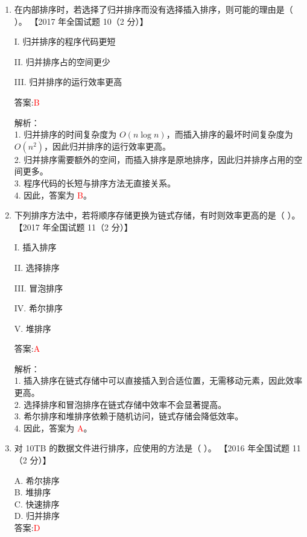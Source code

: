 \documentclass[lang=cn,newtx,10pt,scheme=chinese]{../../../elegantbook}
\begin{document}
\begin{enumerate}
    \item 在内部排序时，若选择了归并排序而没有选择插入排序，则可能的理由是（ ）。  
    【2017 年全国试题 10（2 分）】  

    I. 归并排序的程序代码更短  

    II. 归并排序占的空间更少  

    III. 归并排序的运行效率更高  

    答案:\textcolor{red}{B}

    解析：\\
    1. 归并排序的时间复杂度为 $O(n \log n)$，而插入排序的最坏时间复杂度为 $O(n^2)$，因此归并排序的运行效率更高。\\
    2. 归并排序需要额外的空间，而插入排序是原地排序，因此归并排序占用的空间更多。\\
    3. 程序代码的长短与排序方法无直接关系。\\
    4. 因此，答案为 \textcolor{red}{B}。\\

\item 下列排序方法中，若将顺序存储更换为链式存储，有时则效率更高的是（ ）。  
    【2017 年全国试题 11（2 分）】  

    I. 插入排序  

    II. 选择排序  

    III. 冒泡排序  

    IV. 希尔排序  

    V. 堆排序  

    答案:\textcolor{red}{A}

    解析：\\
    1. 插入排序在链式存储中可以直接插入到合适位置，无需移动元素，因此效率更高。\\
    2. 选择排序和冒泡排序在链式存储中效率不会显著提高。\\
    3. 希尔排序和堆排序依赖于随机访问，链式存储会降低效率。\\
    4. 因此，答案为 \textcolor{red}{A}。\\

\item 对 10TB 的数据文件进行排序，应使用的方法是（ ）。  
    【2016 年全国试题 11（2 分）】  

    A. 希尔排序 \\  
    B. 堆排序 \\  
    C. 快速排序 \\  
    D. 归并排序 \\  

    答案:\textcolor{red}{D}


\end{enumerate}
\end{document}
